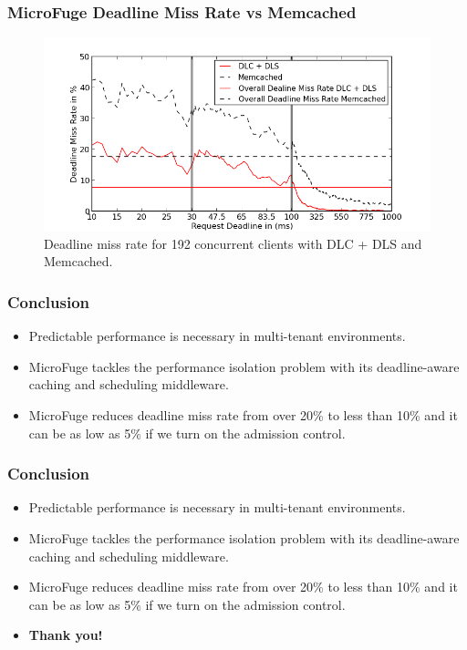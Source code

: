 \documentclass{beamer}
\newcommand{\myv}{\vspace{3 mm}}
\begin{document}
\begin{frame}
  \frametitle{MicroFuge Deadline Miss Rate vs Memcached}
  \begin{figure}[t]
    \begin{center}
      \centerline{\includegraphics[scale=0.5]{img/EC2/EC2_SH_MM/miss_48.png}}
      \caption{Deadline miss rate for 192 concurrent clients with DLC + DLS and Memcached.}
      \label{fig:miss_192_sh_mm}
    \end{center}
  \end{figure}
\end{frame}


\begin{frame}
  \frametitle{Conclusion}
  \begin{itemize}
  \item Predictable performance is necessary in multi-tenant environments.
    \myv
  \item MicroFuge tackles the performance isolation problem with its
    deadline-aware caching and scheduling middleware.
    \myv
  \item MicroFuge reduces deadline miss rate from over 20\% to less than 10\%
    and it can be as low as 5\% if we turn on the admission control.
  \end{itemize}
\end{frame}


\begin{frame}
  \frametitle{Conclusion}
  \begin{itemize}
  \item Predictable performance is necessary in multi-tenant environments.
    \myv
  \item MicroFuge tackles the performance isolation problem with its
    deadline-aware caching and scheduling middleware.
    \myv
  \item MicroFuge reduces deadline miss rate from over 20\% to less than 10\%
    and it can be as low as 5\% if we turn on the admission control.  \myv
  \item \textbf{Thank you!}
  \end{itemize}
\end{frame}
\end{document}
